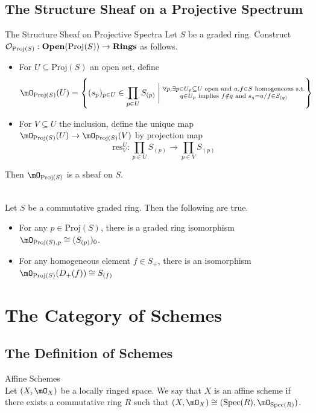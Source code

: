 \documentclass[a4paper]{article}
\begin{document}
\subsection{The Structure Sheaf on a Projective Spectrum}
\begin{defn}{The Structure Sheaf on Projective Spectra}{} Let $S$ be a graded ring. Construct $\mathcal{O}_{\text{Proj}(S)}:\bold{Open}(\text{Proj}(S))\to\bold{Rings}$ as follows. 
\begin{itemize}
\item For $U\subseteq\text{Proj}(S)$ an open set, define $$\mO_{\text{Proj}(S)}(U)=\left\{(s_p)_{p\in U}\in\prod_{p\in U}S_{(p)}\;\bigg{|}\;\substack{\forall p,\exists p\in U_p\subseteq U\text{ open and }a,f\in S\text{ homogeneous s.t.}\\q\in U_p\text{ implies }f\notin q\text{ and }s_q=a/f\in S_{(q)}}\right\}$$
\item For $V\subseteq U$ the inclusion, define the unique map $\mO_{\text{Proj}(S)}(U)\to\mO_{\text{Proj}(S)}(V)$ by projection map $$\text{res}_V^U:\prod_{p\in U}S_{(p)}\to\prod_{p\in V}S_{(p)}$$
\end{itemize}
Then $\mO_{\text{Proj}(S)}$ is a sheaf on $S$. 
\end{defn}

\begin{prp}{}{}\\
Let $S$ be a commutative graded ring. Then the following are true. 
\begin{itemize}
\item For any $p\in\text{Proj}(S)$, there is a graded ring isomorphism $\mO_{\text{Proj}(S),p}\cong(S_{(p)})_0$. 
\item For any homogeneous element $f\in S_+$, there is an isomorphism $\mO_{\text{Proj}(S)}(D_+(f))\cong S_{(f)}$
\end{itemize}
\end{prp}

\pagebreak
\section{The Category of Schemes}
\subsection{The Definition of Schemes}
\begin{defn}{Affine Schemes}{}\\
Let $(X,\mO_X)$ be a locally ringed space. We say that $X$ is an affine scheme if there exists a commutative ring $R$ such that $(X,\mO_X)\cong(\text{Spec}(R),\mO_{\text{Spec}(R)})$. 
\end{defn}
\end{document}
